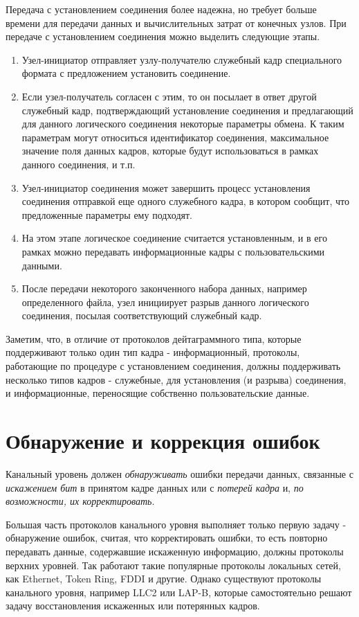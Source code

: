Передача с установлением соединения более надежна, но требует больше времени для передачи данных и вычислительных затрат от конечных узлов.
При передаче с установлением соединения можно выделить следующие этапы.
\begin{enumerate}
    \item Узел-инициатор отправляет узлу-получателю служебный кадр специального формата с предложением установить соединение.
    \item Если узел-получатель согласен с этим, то он посылает в ответ другой служебный кадр, подтверждающий установление соединения и предлагающий для данного логического соединения некоторые параметры обмена.
К таким параметрам могут относиться идентификатор соединения, максимальное значение поля данных кадров, которые будут использоваться в рамках данного соединения, и т.п.
    \item Узел-инициатор соединения может завершить процесс установления соединения отправкой еще одного служебного кадра, в котором сообщит, что предложенные параметры ему подходят.
    \item На этом этапе логическое соединение считается установленным, и в его рамках можно передавать информационные кадры с пользовательскими данными.
    \item После передачи некоторого законченного набора данных, например определенного файла, узел инициирует разрыв данного логического соединения, посылая соответствующий служебный кадр.
\end{enumerate}

Заметим, что, в отличие от протоколов дейтаграммного типа, которые поддерживают только один тип кадра - информационный, протоколы, работающие по процедуре с установлением соединения, должны поддерживать несколько типов кадров - служебные, для установления (и разрыва) соединения, и информационные, переносящие собственно пользовательские данные.

\section{Обнаружение и коррекция ошибок}

Канальный уровень должен \emph{обнаруживать} ошибки передачи данных, связанные с \emph{искажением бит} в принятом кадре данных или с \emph{потерей кадра} и, \emph{по возможности, их корректировать}.

Большая часть протоколов канального уровня выполняет только первую задачу - обнаружение ошибок, считая, что корректировать ошибки, то есть повторно передавать данные, содержавшие искаженную информацию, должны протоколы верхних уровней.
Так работают такие популярные протоколы локальных сетей, как Ethernet, Token Ring, FDDI и другие.
Однако существуют протоколы канального уровня, например LLC2 или LAP-B, которые самостоятельно решают задачу восстановления искаженных или потерянных кадров.

